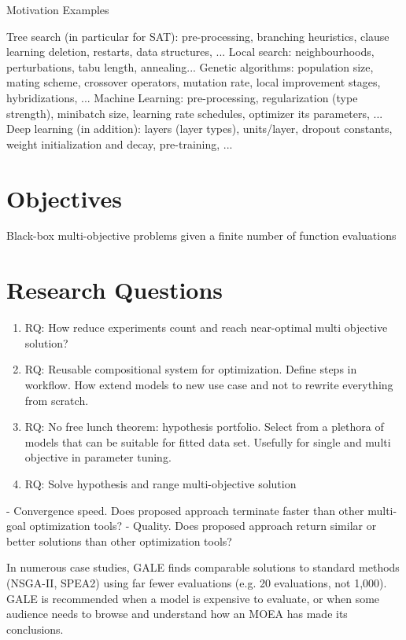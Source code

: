         Motivation Examples

        Tree search (in particular for SAT): pre-processing, branching
        heuristics, clause learning  deletion, restarts, data structures, ...
        Local search: neighbourhoods, perturbations, tabu length, annealing...
        Genetic algorithms: population size, mating scheme, crossover
        operators, mutation rate, local improvement stages, hybridizations, ...
        Machine Learning: pre-processing, regularization (type strength),
        minibatch size, learning rate schedules, optimizer its parameters, ...
        Deep learning (in addition): layers (layer types), units/layer,
        dropout constants, weight initialization and decay, pre-training, ...

\section{Objectives}
    Black-box multi-objective problems given a finite number of function evaluations

\section{Research Questions}
\begin{enumerate}
    \item RQ: How reduce experiments count and reach near-optimal multi objective solution?
    \item RQ: Reusable compositional system for optimization. Define steps in workflow. How extend models to new use case and not to rewrite everything from scratch.
    \item RQ: No free lunch theorem: hypothesis portfolio. Select from a plethora of models that can be suitable for fitted data set. Usefully for single and multi objective in parameter tuning.
    \item RQ: Solve hypothesis and range multi-objective solution
\end{enumerate}

- Convergence speed. Does proposed approach terminate faster than other multi-goal optimization tools?
- Quality. Does proposed approach return similar or better solutions than other optimization tools?


In numerous case studies, GALE finds comparable solutions to standard methods (NSGA-II, SPEA2) using far fewer evaluations (e.g. 20 evaluations, not 1,000). 
GALE is recommended when a model is expensive to evaluate, or when some audience needs to browse and understand how an MOEA has made its conclusions.


